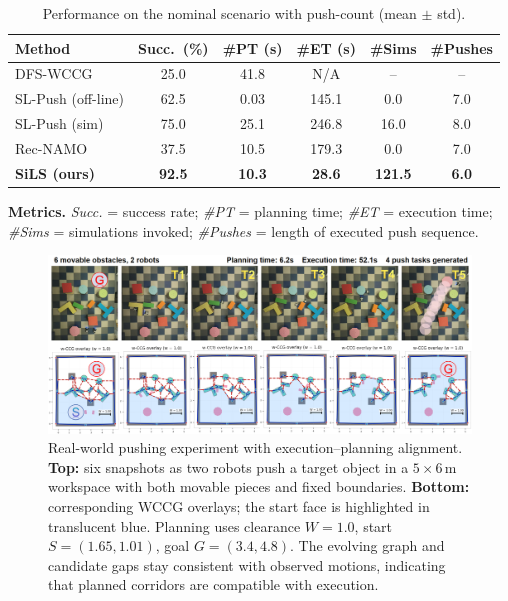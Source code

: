 \begin{table}[t]
  \centering
\begin{threeparttable}
  \caption{Performance on the nominal scenario with push-count (mean $\pm$ std).}
  \label{tab:main}
  \vspace{2pt}
  \setlength{\tabcolsep}{2.3pt}
\begin{tabular}{lccccc}
\toprule
Method & Succ.~(\%) & \#PT (s) & \#ET (s) & \#Sims & \#Pushes \\
\midrule
DFS-WCCG            & 25.0  & 41.8  & N/A     & --    & --   \\
SL-Push (off-line)  & 62.5  & 0.03  & 145.1   & 0.0   & 7.0  \\
SL-Push (sim)       & 75.0  & 25.1  & 246.8   & 16.0  & 8.0  \\
Rec-NAMO            & 37.5  & 10.5  & 179.3   & 0.0   & 7.0  \\
\textbf{SiLS (ours)}& \textbf{92.5} & \textbf{10.3} & \textbf{28.6} & \textbf{121.5} & \textbf{6.0} \\
\bottomrule
\end{tabular}
  \begin{tablenotes}[flushleft]\footnotesize
  \item \textbf{Metrics.} \emph{Succ.} = success rate; \emph{\#PT} = planning time; \emph{\#ET} = execution time; \emph{\#Sims} = simulations invoked; \emph{\#Pushes} = length of executed push sequence.
  \end{tablenotes}
  \end{threeparttable}
  \vspace{-4mm}
\end{table}

\begin{figure}[t]
  \centering
  \includegraphics[width=0.95\linewidth]{figures/hardware_wccg.png}
  \vspace{-4mm}
  \caption{Real-world pushing experiment with execution--planning alignment. \textbf{Top:} six snapshots as two robots push a target object in a \(5{\times}6\,\mathrm{m}\) workspace with both movable pieces and fixed boundaries. \textbf{Bottom:} corresponding WCCG overlays; the start face is highlighted in translucent blue. Planning uses clearance \(W{=}1.0\), start \(S{=}(1.65,1.01)\), goal \(G{=}(3.4,4.8)\). The evolving graph and candidate gaps stay consistent with observed motions, indicating that planned corridors are compatible with execution.}
  \vspace{-4mm}
  \label{fig:hardware}
\end{figure}

